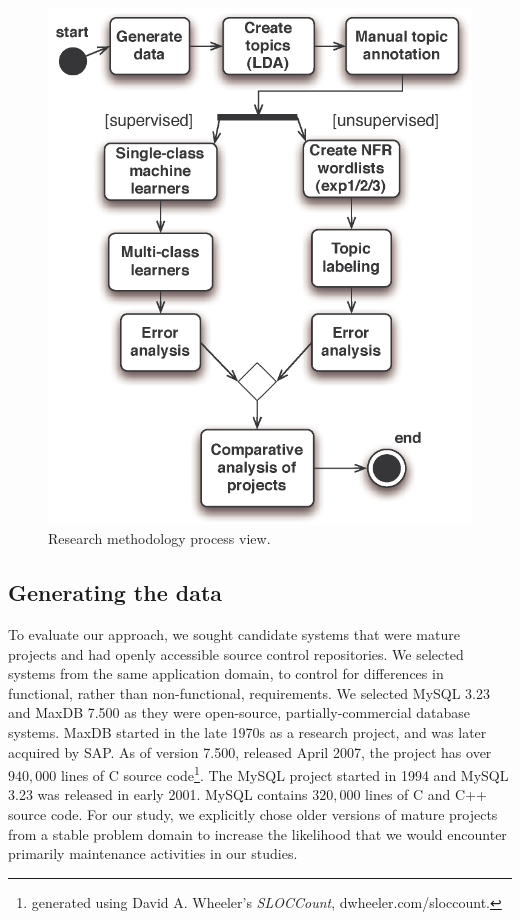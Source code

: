 \documentclass[]{sig-alternate}
\begin{document}
\begin{figure}
  \centering
 \includegraphics[width=.45\textwidth]{figures/process-model}
 \caption{Research methodology process view.}
  \label{fig:process}
\end{figure}

\subsection{Generating the data}
\label{sec:wordlist}

To evaluate our approach, we sought candidate systems that were mature projects and had openly accessible source control repositories. 
We selected systems from the same application domain, to control for differences in functional, rather than non-functional, requirements. 
We selected MySQL 3.23 and MaxDB 7.500 as they were open-source, partially-commercial database systems. 
MaxDB started in the late 1970s as a research project, and was later acquired by SAP. 
As of version 7.500, released April 2007, the project has over $940,000$ lines of C source code\footnote{generated using David A. Wheeler's \emph{SLOCCount}, dwheeler.com/sloccount.}. 
The MySQL project started in 1994 and MySQL 3.23 was released in early 2001. 
MySQL contains $320,000$ lines of C and C++ source code.  
For our study, we explicitly chose older versions of mature projects from a stable problem domain to increase the likelihood that we would encounter primarily maintenance activities in our studies.
\end{document}
